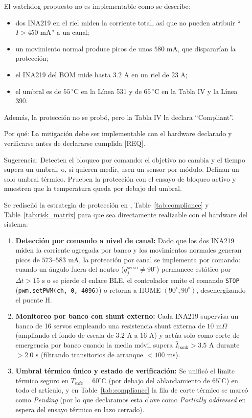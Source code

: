 \documentclass{LabDSTresponse}
\begin{document}
{El watchdog propuesto no es implementable como se describe:
\begin{itemize}
    \item dos INA219 en el riel miden la corriente total, así que no pueden atribuir “$I > 450\text{ mA}$” a un canal;
    \item un movimiento normal produce picos de unos $580\text{ mA}$, que dispararían la protección;
    \item el INA219 del BOM mide hasta $3.2\text{ A}$ en un riel de $23\text{ A}$;
    \item el umbral es de $55\,^\circ\text{C}$ en la Línea 531 y de $65\,^\circ\text{C}$ en la Tabla IV y la Línea 390.
\end{itemize}
Además, la protección no se probó, pero la Tabla IV la declara “Compliant”.

Por qué: La mitigación debe ser implementable con el hardware declarado y verificarse antes de declararse cumplida [REQ].

Sugerencia: Detecten el bloqueo por comando: el objetivo no cambia y el tiempo supera un umbral, o, si quieren medir, usen un sensor por módulo. Definan un solo umbral térmico. Prueben la protección con el ensayo de bloqueo activo y muestren que la temperatura queda por debajo del umbral.}
{Se rediseñó la estrategia de protección en , Table~\ref{tab:compliance} y Table~\ref{tab:risk_matrix} para que sea directamente realizable con el hardware del sistema:
\begin{enumerate}
    \item \textbf{Detección por comando a nivel de canal:} Dado que los dos INA219 miden la corriente agregada por banco y los movimientos normales generan picos de $573\text{--}583\text{ mA}$, la protección por canal se implementa por comando: cuando un ángulo fuera del neutro ($q_j^{\text{servo}} \neq 90^\circ$) permanece estático por $\Delta t > 15\text{ s}$ o se pierde el enlace BLE, el controlador emite el comando \texttt{STOP} (\texttt{pwm.setPWM(ch, 0, 4096)}) o retorna a HOME $(90^\circ, 90^\circ)$, desenergizando el puente H.
    \item \textbf{Monitoreo por banco con shunt externo:} Cada INA219 supervisa un banco de 16 servos empleando una resistencia shunt externa de $10\text{ m}\Omega$ (ampliando el fondo de escala de $3.2\text{ A}$ a $16\text{ A}$) y actúa solo como corte de emergencia por banco cuando la media móvil supera $\bar{I}_{\text{bank}} > 3.5\text{ A}$ durante $> 2.0\text{ s}$ (filtrando transitorios de arranque $< 100\text{ ms}$).
    \item \textbf{Umbral térmico único y estado de verificación:} Se unificó el límite térmico seguro en $T_{\text{safe}} = 60^\circ\text{C}$ (por debajo del ablandamiento de $65^\circ\text{C}$) en todo el artículo, y en Table~\ref{tab:compliance} la fila de corte térmico se marcó como \textit{Pending} (por lo que declaramos esta clave como \textit{Partially addressed} en espera del ensayo térmico en lazo cerrado).
\end{enumerate}}
\end{document}
